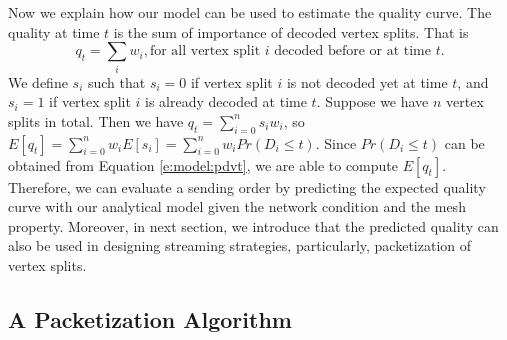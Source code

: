     Now we explain how our model can be used to estimate the quality 
    curve. The quality at time $t$ is the sum of importance of 
    decoded vertex splits. That is
    \begin{displaymath}
    q_t =  \sum_i w_i, \textrm{for all vertex split $i$ decoded before or at time $t$}.
    \end{displaymath}
    We define $s_i$ such that
    $s_i = 0$ if vertex split $i$ is not decoded yet at time $t$, and
    $s_i = 1$ if vertex split $i$ is already decoded at time $t$.
    Suppose we have $n$ vertex splits in total.
    Then we have
    $q_t    = \sum_{i=0}^{n}s_{i}w_{i}$, so
    $E[q_t] = \sum_{i=0}^{n}w_{i}E[s_{i}] = \sum_{i=0}^{n}w_{i}Pr(D_i \leq t)$.
    Since $Pr(D_i \leq t)$ can be obtained from Equation \ref{e:model:pdvt}, we are able to compute $E[q_t]$. 
    Therefore, we can evaluate a sending order by predicting the expected
    quality curve with our analytical model given the network condition
    and the mesh property. Moreover, in next section, we introduce that
    the predicted quality can also be used in designing streaming strategies, 
    particularly, packetization of vertex splits.

\subsection{A Packetization Algorithm}
\label{s:model:scheduling}


